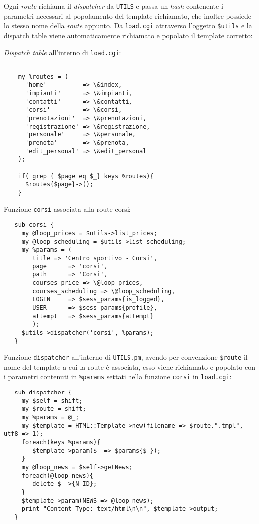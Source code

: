 Ogni \textit{route} richiama il \textit{dispatcher} da \texttt{UTILS} e passa un \textit{hash} contenente i parametri necessari al popolamento del template richiamato, che inoltre possiede lo stesso nome della \textit{route} appunto.\newline
Da \texttt{load.cgi} attraverso l'oggetto \texttt{\$utils} e la dispatch table viene automaticamente richiamato e popolato il template corretto: \newline \newline

\small{\textit{Dispatch table} all'interno di \texttt{load.cgi}:}


\scriptsize{
\begin{verbatim}

    my %routes = (
      'home'          => \&index,
      'impianti'      => \&impianti,
      'contatti'      => \&contatti,
      'corsi'         => \&corsi,
      'prenotazioni'  => \&prenotazioni,
      'registrazione' => \&registrazione,
      'personale'     => \&personale,
      'prenota'       => \&prenota,
      'edit_personal' => \&edit_personal
    );

    if( grep { $page eq $_} keys %routes){
      $routes{$page}->();
    }

\end{verbatim}
}

\small{Funzione \texttt{corsi} associata alla route corsi:}

\scriptsize{
\begin{verbatim}
   sub corsi {
     my @loop_prices = $utils->list_prices;
     my @loop_scheduling = $utils->list_scheduling;
     my %params = (
        title => 'Centro sportivo - Corsi',
        page      => 'corsi',
        path      => 'Corsi',
        courses_price => \@loop_prices,
        courses_scheduling => \@loop_scheduling,
        LOGIN     => $sess_params{is_logged},
        USER      => $sess_params{profile},
        attempt   => $sess_params{attempt}
        );
     $utils->dispatcher('corsi', %params);
   }
\end{verbatim}
}
\small{Funzione \texttt{dispatcher} all'interno di \texttt{UTILS.pm}, avendo per convenzione \texttt{\$route} il nome del template a cui la route è associata, esso viene richiamato e popolato con i parametri contenuti in \texttt{\%params} settati nella funzione \texttt{corsi} in \texttt{load.cgi}:}
 
\scriptsize{
\begin{verbatim}
   sub dispatcher {
     my $self = shift;
     my $route = shift;
     my %params = @_;
     my $template = HTML::Template->new(filename => $route.".tmpl", utf8 => 1);
     foreach(keys %params){
        $template->param($_ => $params{$_});
     }	
     my @loop_news = $self->getNews;
     foreach(@loop_news){
        delete $_->{N_ID};
     }
     $template->param(NEWS => @loop_news);
     print "Content-Type: text/html\n\n", $template->output;
   }
\end{verbatim}
}

